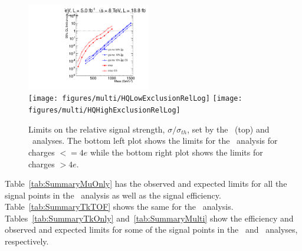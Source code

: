 \begin{figure}
\centering
  \includegraphics[clip=false, trim=0.0cm 0cm 0.0cm 0cm, width=0.48\textwidth]{figures/tkonly/TkExclusionRelLog} \\
  \texttt{[image: figures/multi/HQLowExclusionRelLog]}
  \texttt{[image: figures/multi/HQHighExclusionRelLog]}
\caption[Limits on the relative signal strength, $\sigma/\sigma_{th}$, set by the \tkonly\ and \multi\ analyses]
{Limits on the relative signal strength, $\sigma/\sigma_{th}$,  set by the \tkonly\ (top) and \multi\ analyses.
The bottom left plot shows the limits for the \multi\ analysis for charges $<= 4e$ while the bottom right plot shows the limits for charges $> 4e$.
}
    \label{fig:TkRelExclusion}
\end{figure}

Table~\ref{tab:SummaryMuOnly} has the observed and expected limits for all the signal points in the \muononly\ analysis as well as the signal efficiency. 
Table~\ref{tab:SummaryTkTOF} shows the same for the \tktof\ analysis. Tables~\ref{tab:SummaryTkOnly} and~\ref{tab:SummaryMulti} show the efficiency
and observed and expected limits for some of the signal points in the \tkonly\ and \multi\ analyses, respectively.


